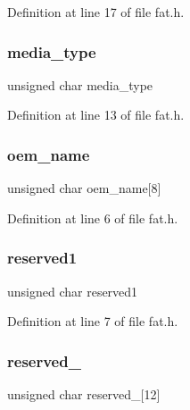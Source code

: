 Definition at line 17 of file fat.\+h.

\mbox{\label{a00158_ab90dc4a72adfaa3c57712df0dab86154_ab90dc4a72adfaa3c57712df0dab86154}} 
\subsubsection{\texorpdfstring{media\+\_\+type}{media\_type}}
{\footnotesize\ttfamily unsigned char media\+\_\+type}



Definition at line 13 of file fat.\+h.

\mbox{\label{a00158_aad08c3f8e8a444d492cc77be16a79d86_aad08c3f8e8a444d492cc77be16a79d86}} 
\subsubsection{\texorpdfstring{oem\+\_\+name}{oem\_name}}
{\footnotesize\ttfamily unsigned char oem\+\_\+name\mbox{[}8\mbox{]}}



Definition at line 6 of file fat.\+h.

\mbox{\label{a00158_affe215a7220b2d52fb9dacf3b35e56dc_affe215a7220b2d52fb9dacf3b35e56dc}} 
\subsubsection{\texorpdfstring{reserved1}{reserved1}}
{\footnotesize\ttfamily unsigned char reserved1}



Definition at line 7 of file fat.\+h.

\mbox{\label{a00158_a9be1862088e39957378b98c43222fc0d_a9be1862088e39957378b98c43222fc0d}} 
\subsubsection{\texorpdfstring{reserved\+\_}{reserved\_0}}
{\footnotesize\ttfamily unsigned char reserved\+\_\mbox{[}12\mbox{]}}



